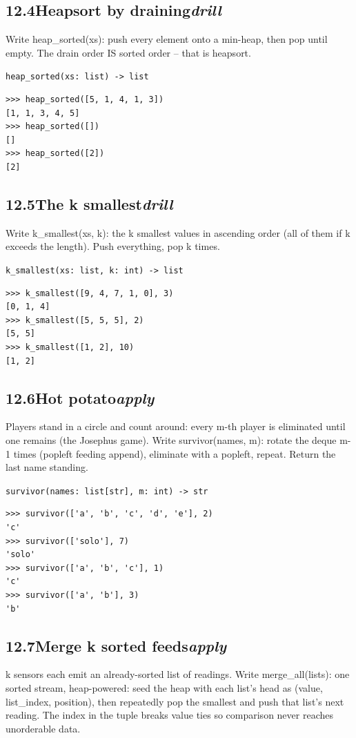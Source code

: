 \documentclass[10pt,letterpaper]{book}
\begin{document}
\subsection*{12.4\quad Heapsort by draining\hfill\textnormal{\textit{drill}}}
Write heap\_sorted(xs): push every element onto a min-heap, then pop until empty. The drain order IS sorted order -- that is heapsort.

\noindent\texttt{heap\_sorted(xs: list) -> list}
\begin{lstlisting}[style=ex]
>>> heap_sorted([5, 1, 4, 1, 3])
[1, 1, 3, 4, 5]
>>> heap_sorted([])
[]
>>> heap_sorted([2])
[2]
\end{lstlisting}
\subsection*{12.5\quad The k smallest\hfill\textnormal{\textit{drill}}}
Write k\_smallest(xs, k): the k smallest values in ascending order (all of them if k exceeds the length). Push everything, pop k times.

\noindent\texttt{k\_smallest(xs: list, k: int) -> list}
\begin{lstlisting}[style=ex]
>>> k_smallest([9, 4, 7, 1, 0], 3)
[0, 1, 4]
>>> k_smallest([5, 5, 5], 2)
[5, 5]
>>> k_smallest([1, 2], 10)
[1, 2]
\end{lstlisting}
\subsection*{12.6\quad Hot potato\hfill\textnormal{\textit{apply}}}
Players stand in a circle and count around: every m-th player is eliminated until one remains (the Josephus game). Write survivor(names, m): rotate the deque m-1 times (popleft feeding append), eliminate with a popleft, repeat. Return the last name standing.

\noindent\texttt{survivor(names: list[str], m: int) -> str}
\begin{lstlisting}[style=ex]
>>> survivor(['a', 'b', 'c', 'd', 'e'], 2)
'c'
>>> survivor(['solo'], 7)
'solo'
>>> survivor(['a', 'b', 'c'], 1)
'c'
>>> survivor(['a', 'b'], 3)
'b'
\end{lstlisting}
\subsection*{12.7\quad Merge k sorted feeds\hfill\textnormal{\textit{apply}}}
k sensors each emit an already-sorted list of readings. Write merge\_all(lists): one sorted stream, heap-powered: seed the heap with each list's head as (value, list\_index, position), then repeatedly pop the smallest and push that list's next reading. The index in the tuple breaks value ties so comparison never reaches unorderable data.
\end{document}
